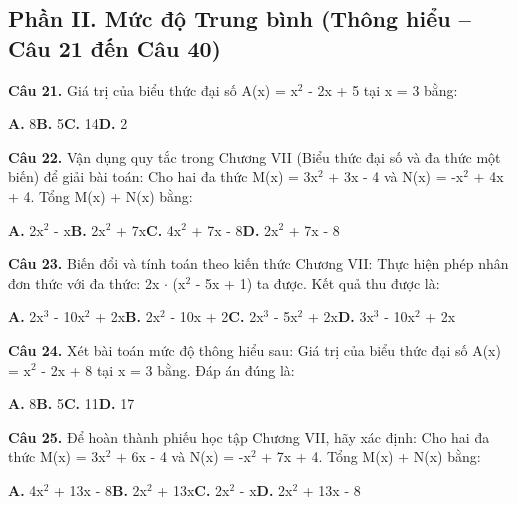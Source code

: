 \documentclass[11pt,a4paper]{article}
\begin{document}
\subsection*{\color{accent} Phần II. Mức độ Trung bình (Thông hiểu -- Câu 21 đến Câu 40)}
\textbf{\color{primary} Câu 21.} Giá trị của biểu thức đại số A(x) = x$^2$ - 2x + 5 tại x = 3 bằng:\par
\hspace*{1.5em}\textbf{A.} 8\quad\quad \textbf{B.} 5\quad\quad \textbf{C.} 14\quad\quad \textbf{D.} 2\par\vspace{2pt}
\textbf{\color{primary} Câu 22.} Vận dụng quy tắc trong Chương VII (Biểu thức đại số và đa thức một biến) để giải bài toán: Cho hai đa thức M(x) = 3x$^2$ + 3x - 4 và N(x) = -x$^2$ + 4x + 4. Tổng M(x) + N(x) bằng:\par
\hspace*{1.5em}\textbf{A.} 2x$^2$ - x\quad\quad \textbf{B.} 2x$^2$ + 7x\quad\quad \textbf{C.} 4x$^2$ + 7x - 8\quad\quad \textbf{D.} 2x$^2$ + 7x - 8\par\vspace{2pt}
\textbf{\color{primary} Câu 23.} Biến đổi và tính toán theo kiến thức Chương VII: Thực hiện phép nhân đơn thức với đa thức: 2x $\cdot$ (x$^2$ - 5x + 1) ta được. Kết quả thu được là:\par
\hspace*{1.5em}\textbf{A.} 2x$^3$ - 10x$^2$ + 2x\quad\quad \textbf{B.} 2x$^2$ - 10x + 2\quad\quad \textbf{C.} 2x$^3$ - 5x$^2$ + 2x\quad\quad \textbf{D.} 3x$^3$ - 10x$^2$ + 2x\par\vspace{2pt}
\textbf{\color{primary} Câu 24.} Xét bài toán mức độ thông hiểu sau: Giá trị của biểu thức đại số A(x) = x$^2$ - 2x + 8 tại x = 3 bằng. Đáp án đúng là:\par
\hspace*{1.5em}\textbf{A.} 8\quad\quad \textbf{B.} 5\quad\quad \textbf{C.} 11\quad\quad \textbf{D.} 17\par\vspace{2pt}
\textbf{\color{primary} Câu 25.} Để hoàn thành phiếu học tập Chương VII, hãy xác định: Cho hai đa thức M(x) = 3x$^2$ + 6x - 4 và N(x) = -x$^2$ + 7x + 4. Tổng M(x) + N(x) bằng:\par
\hspace*{1.5em}\textbf{A.} 4x$^2$ + 13x - 8\quad\quad \textbf{B.} 2x$^2$ + 13x\quad\quad \textbf{C.} 2x$^2$ - x\quad\quad \textbf{D.} 2x$^2$ + 13x - 8\par\vspace{2pt}
\end{document}
